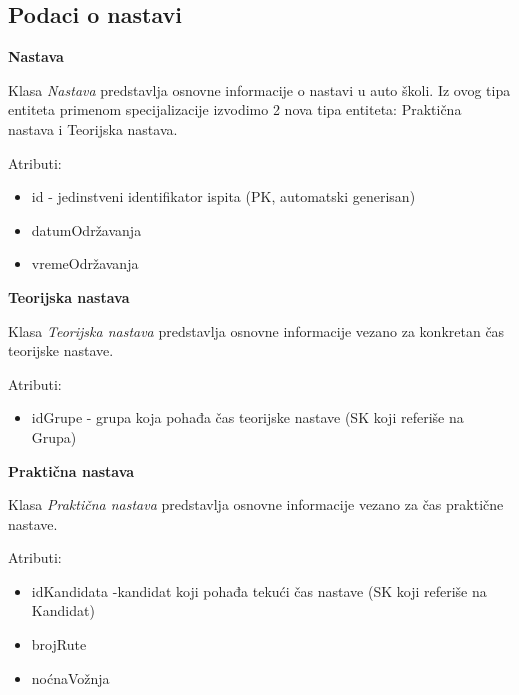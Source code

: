 \subsection{Podaci o nastavi}

\textbf{\large Nastava}
\vspace{0.3cm}

Klasa \textit{Nastava} predstavlja osnovne informacije o nastavi u auto školi. Iz ovog tipa entiteta primenom specijalizacije izvodimo 2 nova tipa entiteta: Praktična nastava i Teorijska nastava.

Atributi:
\begin{itemize}
    \item id - jedinstveni identifikator ispita (PK, automatski generisan)
    \item datumOdržavanja
    \item vremeOdržavanja
\end{itemize}

\textbf{\large Teorijska nastava}
\vspace{0.3cm}

Klasa \textit{Teorijska nastava} predstavlja osnovne informacije vezano za konkretan čas teorijske nastave.

Atributi:
\begin{itemize}
    \item idGrupe - grupa koja pohađa čas teorijske nastave (SK koji referiše na Grupa)
\end{itemize}

\textbf{\large Praktična nastava}
\vspace{0.3cm}

Klasa \textit{Praktična nastava} predstavlja osnovne informacije vezano za čas praktične nastave.

Atributi:
\begin{itemize}
    \item idKandidata -kandidat koji pohađa tekući čas nastave (SK koji referiše na Kandidat)
    \item brojRute
    \item noćnaVožnja
\end{itemize}

